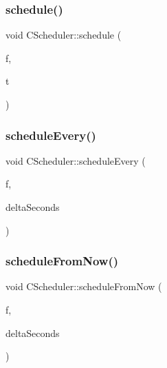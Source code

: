 \mbox{\label{class_c_scheduler_a14747dc42599cc0a17f45f1767932d6e}} 
\subsubsection{\texorpdfstring{schedule()}{schedule()}}
{\footnotesize\ttfamily void C\+Scheduler\+::schedule (\begin{DoxyParamCaption}\item[{\mbox{\hyperlink{class_c_scheduler_af0202f526eeef71defb156dc06f70279}{C\+Scheduler\+::\+Function}}}]{f,  }\item[{boost\+::chrono\+::system\+\_\+clock\+::time\+\_\+point}]{t }\end{DoxyParamCaption})}

\mbox{\label{class_c_scheduler_ad7fcff70877bf1d84f30c1137bba816f}} 
\subsubsection{\texorpdfstring{schedule\+Every()}{scheduleEvery()}}
{\footnotesize\ttfamily void C\+Scheduler\+::schedule\+Every (\begin{DoxyParamCaption}\item[{\mbox{\hyperlink{class_c_scheduler_af0202f526eeef71defb156dc06f70279}{C\+Scheduler\+::\+Function}}}]{f,  }\item[{int64\+\_\+t}]{delta\+Seconds }\end{DoxyParamCaption})}

\mbox{\label{class_c_scheduler_ad5faa192176dc51e3c68356589934b7a}} 
\subsubsection{\texorpdfstring{schedule\+From\+Now()}{scheduleFromNow()}}
{\footnotesize\ttfamily void C\+Scheduler\+::schedule\+From\+Now (\begin{DoxyParamCaption}\item[{\mbox{\hyperlink{class_c_scheduler_af0202f526eeef71defb156dc06f70279}{C\+Scheduler\+::\+Function}}}]{f,  }\item[{int64\+\_\+t}]{delta\+Seconds }\end{DoxyParamCaption})}

